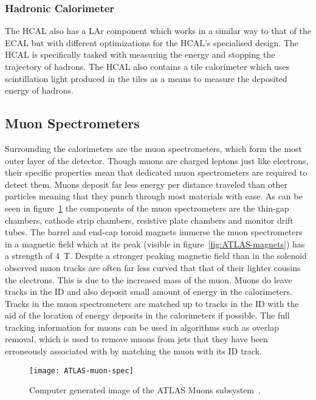 \subsubsection{Hadronic Calorimeter}
The HCAL also has a LAr component which works in a similar way to that of the
ECAL but with different optimizations for the HCAL's specialised design. The
HCAL is specifically tasked with measuring the energy and stopping the
trajectory of hadrons. The HCAL also contains a tile calorimeter which uses
scintillation light produced in the tiles as a means to measure the deposited
energy of hadrons. 

\subsection{Muon Spectrometers}%
\label{sec:muon}

Surrounding the calorimeters are the muon spectrometers, which form the most
outer layer of the detector. Though muons are charged leptons just like
electrons, their specific properties mean that dedicated muon spectrometers are
required to detect them. Muons deposit far less energy per distance traveled
than other particles meaning that they punch through most materials with ease.
As can be seen in figure~\ref{fig:ATLAS-muon} the components of the muon
spectrometers are the thin-gap chambers, cathode strip chambers, resistive plate
chambers and monitor drift tubes. The barrel and end-cap toroid magnets immerse
the muon spectrometers in a magnetic field which at its peak (visible in
figure~\ref{fig:ATLAS-magnets}) has a strength of 4~T. Despite a stronger
peaking magnetic field than in the solenoid observed muon tracks are often far
less curved that that of their lighter cousins the electrons. This is due to the
increased mass of the muon. Muons do leave tracks in the ID and also deposit
small amount of energy in the calorimeters. Tracks in the muon spectrometers are
matched up to tracks in the ID with the aid of the location of energy deposits
in the calorimeters if possible. The full tracking information for muons can be
used in algorithms such as overlap removal, which is used to remove muons from
jets that they have been erroneously associated with by matching the muon with
its ID track.
\begin{figure}[h]
  \centering
  \texttt{[image: ATLAS-muon-spec]}
  \caption[ATLAS muon subsystem]{Computer generated image of the ATLAS Muons
    subsystem~\cite{ATLAS-muon-fig}.}%
  \label{fig:ATLAS-muon}
\end{figure}

